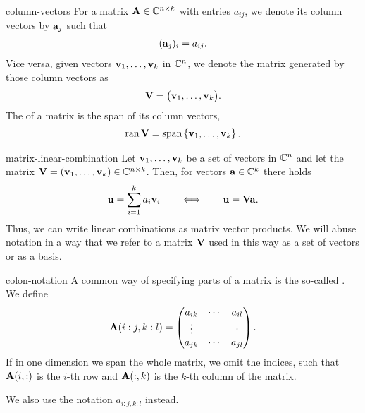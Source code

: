 \begin{Notation}{column-vectors}
  For a matrix $\mathbf A\in \mathbb C^{n\times k}$ with entries $a_{ij}$, we denote its column vectors by $\mathbf a_j$ such that
  \begin{gather}
      (\mathbf a_j)_i = a_{ij}.
  \end{gather}
  Vice versa, given vectors $\mathbf v_1,\dots,\mathbf v_k$ in $\mathbb C^n$, we denote the matrix generated by those column vectors as
  \begin{gather}
    \mathbf V = \bigl( \mathbf v_1,\dots,\mathbf v_k\bigr).
  \end{gather}
  The  of a matrix is the span of its column vectors,
  \begin{gather}
    \operatorname{ran}\mathbf V = \operatorname{span}\left\{\mathbf v_1,\dots,\mathbf v_k\right\}.
  \end{gather}
\end{Notation}

\begin{Notation}{matrix-linear-combination}
  Let $\mathbf v_1,\dots,\mathbf v_k$ be a set of vectors in $\mathbb C^n$ and let the matrix $\mathbf V=(\mathbf v_1,\dots,\mathbf v_k) \in \mathbb C^{n\times k}$. Then, for vectors $\mathbf a\in\mathbb C^k$ there holds
  \begin{gather}
      \mathbf u = \sum_{i=1}^k a_i \mathbf v_i
      \qquad \Longleftrightarrow \qquad
      \mathbf u = \mathbf V \mathbf a.
  \end{gather}
  Thus, we can write linear combinations as matrix vector products.
  We will abuse notation in a way that we refer to a matrix $\mathbf V$
  used in this way as a set of vectors or as a basis.
\end{Notation}

\begin{Notation}{colon-notation}
  A common way of specifying parts of a matrix is the so-called . We define
  \begin{gather}
    \mathbf A(i:j,k:l) =
    \begin{pmatrix}
      a_{ik}&\cdots&a_{il}\\
      \vdots&&\vdots\\
      a_{jk}&\cdots&a_{jl}
    \end{pmatrix}.
  \end{gather}
  If in one dimension we span the whole matrix, we omit the indices,
  such that $\mathbf A(i,:)$ is the $i$-th row and $\mathbf A(:,k)$ is the $k$-th
  column of the matrix.

  We also use the notation $a_{i:j,k:l}$ instead.
\end{Notation}

